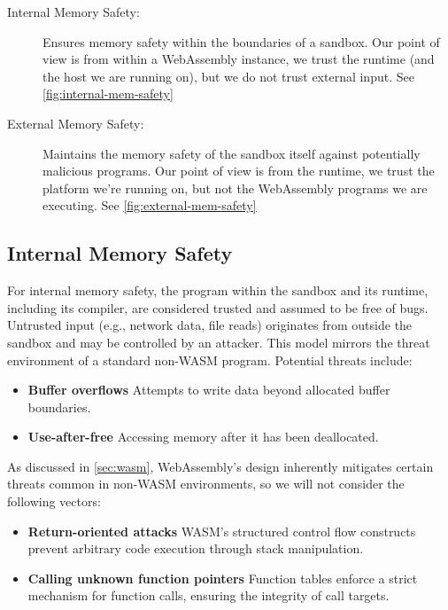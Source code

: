 \begin{description}
    \item[Internal Memory Safety:] Ensures memory safety within the boundaries of a sandbox.
    Our point of view is from within a WebAssembly instance, we trust the runtime (and the host we are running on), but we do not trust external input.
    See \cref{fig:internal-mem-safety}
    \item[External Memory Safety:] Maintains the memory safety of the sandbox itself against potentially malicious programs.
    Our point of view is from the runtime, we trust the platform we're running on, but not the WebAssembly programs we are executing.
    See \cref{fig:external-mem-safety}
\end{description}

\subsection{Internal Memory Safety}
\label{subsec:internal-memory-safety}
For internal memory safety, the program within the sandbox and its runtime, including its compiler, are considered trusted and assumed to be free of bugs.
Untrusted input (e.g., network data, file reads) originates from outside the sandbox and may be controlled by an attacker.
This model mirrors the threat environment of a standard non-\ac{WASM} program.
Potential threats include:

\begin{itemize}
    \item \textbf{Buffer overflows} Attempts to write data beyond allocated buffer boundaries.
    \item \textbf{Use-after-free} Accessing memory after it has been deallocated.
\end{itemize}

As discussed in \cref{sec:wasm}, WebAssembly's design inherently mitigates certain threats common in non-\ac{WASM} environments, so we will not consider the following vectors:

\begin{itemize}
    \item \textbf{Return-oriented attacks} {\ac{WASM}'s} structured control flow constructs prevent arbitrary code execution through stack manipulation.
    \item \textbf{Calling unknown function pointers} Function tables enforce a strict mechanism for function calls, ensuring the integrity of call targets.
\end{itemize}

